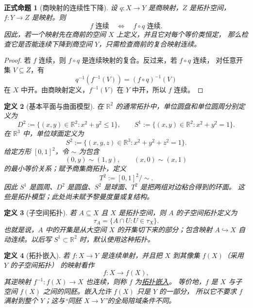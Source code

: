 \documentclass[UTF8,fontset=none,a4paper,11pt]{ctexart}
\theoremstyle{foundation-definition}
\newtheorem{definition}{定义}[section]
\theoremstyle{foundation-theorem}
\theoremstyle{foundation-proposition}
\newtheorem{proposition}[definition]{正式命题}
\theoremstyle{foundation-example}
\theoremstyle{foundation-remark}
\theoremstyle{foundation-theorem}
\newcommand{\term}[2]{\hyperref[#1]{#2}}
\begin{document}
\begin{proposition}[商映射的连续性下降]\label{prop:quotient-continuity-descent}
设 \(q:X\to Y\) 是商映射，\(Z\) 是拓扑空间，\(f:Y\to Z\) 是映射。则
\[
f\text{ 连续}\quad\Longleftrightarrow\quad f\circ q\text{ 连续}.
\]
因此，若一个映射先在商前的空间 \(X\) 上定义，并且它对每个等价类恒定，
那么检查它是否能连续下降到商空间 \(Y\)，只需检查商前的复合映射连续。
\end{proposition}

\begin{proof}
若 \(f\) 连续，则 \(f\circ q\) 是连续映射的复合。反过来，若 \(f\circ q\) 连续，
对任意开集 \(V\subseteq Z\)，有
\[
q^{-1}(f^{-1}(V))=(f\circ q)^{-1}(V)
\]
在 \(X\) 中开。由商映射定义，\(f^{-1}(V)\) 在 \(Y\) 中开，所以 \(f\) 连续。
\end{proof}

\begin{definition}[基本平面与曲面模型]\label{def:basic-planar-models}
在 \(\mathbb R^2\) 的通常拓扑中，单位圆盘和单位圆周分别定义为
\[
D^2:=\{(x,y)\in\mathbb R^2:x^2+y^2\le1\},\qquad
S^1:=\{(x,y)\in\mathbb R^2:x^2+y^2=1\}.
\]
在 \(\mathbb R^3\) 中，单位球面定义为
\[
S^2:=\{(x,y,z)\in\mathbb R^3:x^2+y^2+z^2=1\}.
\]
给定方形 \([0,1]^2\)，令 \(\sim\) 为包含
\[
(0,y)\sim(1,y),\qquad (x,0)\sim(x,1)
\]
的最小等价关系；赋予商集商拓扑，定义
\[
T^2:=[0,1]^2/{\sim}.
\]
因此 \(S^1\) 是圆周、\(D^2\) 是圆盘、\(S^2\) 是球面、\(T^2\) 是把两组对边粘合得到的环面。
这些是拓扑模型；此处尚未赋予黎曼度量或复结构。
\end{definition}

\begin{definition}[子空间拓扑]\label{def:subspace-topology}
若 \(A\subseteq X\) 且 \(X\) 是拓扑空间，则 \(A\) 的子空间拓扑定义为
\[
\tau_A=\{A\cap U:U\in\tau_X\}.
\]
也就是说，\(A\) 中的开集是从大空间 \(X\) 的开集切下来的部分；包含映射
\(A\hookrightarrow X\) 自动连续。以后写 \(S^1\subset\mathbb R^2\) 时，默认使用这种拓扑。
\end{definition}

\begin{definition}[拓扑嵌入]\label{def:topological-embedding}
若 \(f:X\to Y\) 是连续单射，并且把 \(X\) 到其像集 \(f(X)\)（采用 \(Y\) 的子空间拓扑）
的映射看作
\[
f:X\longrightarrow f(X),
\]
其逆映射 \(f^{-1}:f(X)\to X\) 也连续，则称 \(f\) 为\term{def:topological-embedding}{拓扑嵌入}。
等价地，\(f\) 是 \(X\) 与子空间 \(f(X)\) 之间的同胚。嵌入允许 \(f(X)\) 只是 \(Y\) 的一部分，
所以它不要求 \(f\) 满射到整个 \(Y\)；这与“同胚 \(X\to Y\)”的全局陪域条件不同。
\end{definition}
\end{document}
